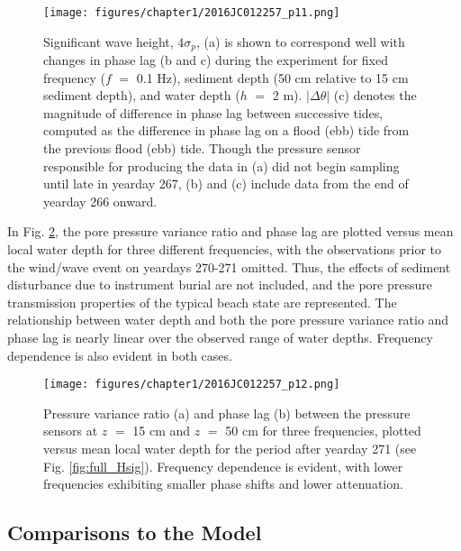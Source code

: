 \begin{figure} %
		\noindent\texttt{[image: figures/chapter1/2016JC012257\_p11.png]}
	\caption[Significant wave height and pore pressure phase response]{Significant wave height, $4\sigma_{p}$, (a) is shown to correspond well with changes in phase lag (b and c) during the experiment for fixed frequency ($f$ $=$ 0.1 Hz), sediment depth (50 cm relative to 15 cm sediment depth), and water depth ($h$ $=$ 2 m). $|\Delta\theta|$ (c) denotes the magnitude of difference in phase lag between successive tides, computed as the difference in phase lag on a flood (ebb) tide from the previous flood (ebb) tide. Though the pressure sensor responsible for producing the data in (a) did not begin sampling until late in yearday 267, (b) and (c) include data from the end of yearday 266 onward.}
	\label{fig:delta_phase}
\end{figure}

In Fig. \ref{fig:full_hdepth}, the pore pressure variance ratio and phase lag are plotted versus mean local water depth for three different frequencies, with the observations prior to the wind/wave event on yeardays 270-271 omitted. Thus, the effects of sediment disturbance due to instrument burial are not included, and the pore pressure transmission properties of the typical beach state are represented. The relationship between water depth and both the pore pressure variance ratio and phase lag is nearly linear over the observed range of water depths. Frequency dependence is also evident in both cases.

\begin{figure} %
\begin{center}		
		\noindent\texttt{[image: figures/chapter1/2016JC012257\_p12.png]}
	\caption[Pore pressure variance ratio and phase lag versus water depth]{Pressure variance ratio (a) and phase lag (b) between the pressure sensors at $z$ $=$ 15 cm and $z$ $=$ 50 cm for three frequencies, plotted versus mean local water depth for the period after yearday 271 (see Fig. \ref{fig:full_Hsig}). Frequency dependence is evident, with lower frequencies exhibiting smaller phase shifts and lower attenuation.}
	\label{fig:full_hdepth}
\end{center}	
\end{figure}


\subsection{Comparisons to the \citeauthor{Yamamoto_etal1978} Model}\label{subsec:model}

